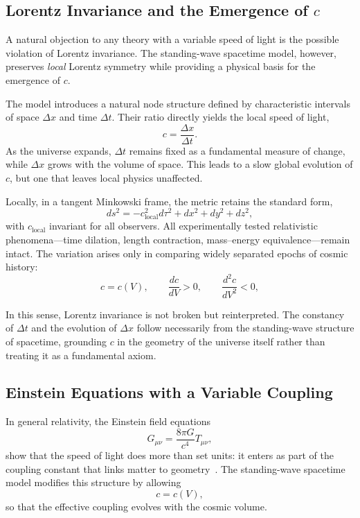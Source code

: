 \documentclass[12pt]{article}
\begin{document}
\subsection{Lorentz Invariance and the Emergence of \texorpdfstring{$c$}{c}}

A natural objection to any theory with a variable speed of light is the possible violation of Lorentz invariance. The standing-wave spacetime model, however, preserves \emph{local} Lorentz symmetry while providing a physical basis for the emergence of $c$.

The model introduces a natural node structure defined by characteristic intervals of space $\Delta x$ and time $\Delta t$. Their ratio directly yields the local speed of light,
\begin{equation}
c = \frac{\Delta x}{\Delta t}.
\end{equation}
As the universe expands, $\Delta t$ remains fixed as a fundamental measure of change, while $\Delta x$ grows with the volume of space. This leads to a slow global evolution of $c$, but one that leaves local physics unaffected.

Locally, in a tangent Minkowski frame, the metric retains the standard form,
\begin{equation}
ds^2 = -c_{\text{local}}^2 d\tau^2 + dx^2 + dy^2 + dz^2,
\end{equation}
with $c_{\text{local}}$ invariant for all observers. All experimentally tested relativistic phenomena---time dilation, length contraction, mass–energy equivalence---remain intact. The variation arises only in comparing widely separated epochs of cosmic history:
\begin{equation}
  c = c(V), \qquad \frac{dc}{dV} > 0, \qquad \frac{d^2c}{dV^2} < 0,
\end{equation}

In this sense, Lorentz invariance is not broken but reinterpreted. The constancy of $\Delta t$ and the evolution of $\Delta x$ follow necessarily from the standing-wave structure of spacetime, grounding $c$ in the geometry of the universe itself rather than treating it as a fundamental axiom.

\subsection{Einstein Equations with a Variable Coupling}

In general relativity, the Einstein field equations~\cite{misner1973}  
\begin{equation}
  G_{\mu\nu} = \frac{8\pi G}{c^4} T_{\mu\nu},
\end{equation}
show that the speed of light does more than set units: it enters as part of the coupling constant that links matter to geometry~\cite{albrecht1999}. The standing-wave spacetime model modifies this structure by allowing
\begin{equation}
  c = c(V),
\end{equation}
so that the effective coupling evolves with the cosmic volume.
\end{document}
